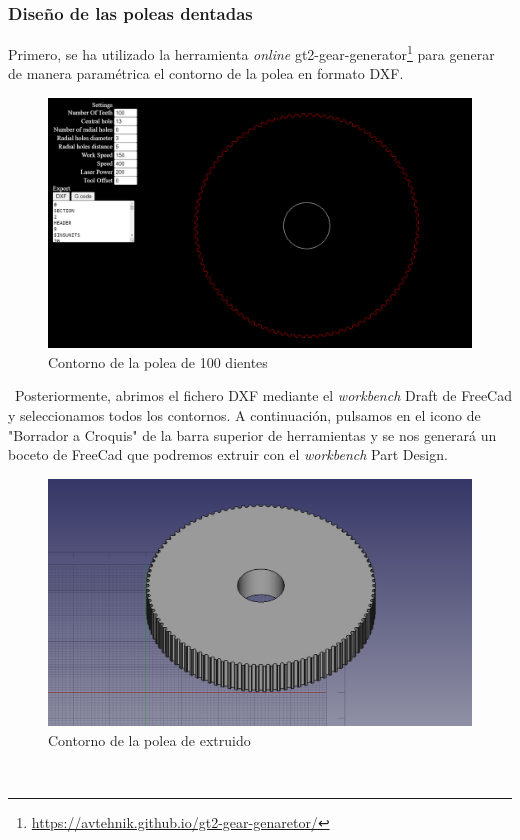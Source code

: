 \subsubsection{Diseño de las poleas dentadas}
Primero, se ha utilizado la herramienta \textit{online} 
gt2-gear-generator\footnote{\url{https://avtehnik.github.io/gt2-gear-genaretor/}} para generar de manera paramétrica el contorno de la polea 
en formato DXF.\\
\begin{figure} [ht!]
  \begin{center}
    \includegraphics[width=14cm]{figs/dxf_polea.png}
  \end{center}
  \caption{Contorno de la polea de 100 dientes}
\end{figure}\ 
Posteriormente, abrimos el fichero DXF mediante el \textit{workbench} Draft de FreeCad y seleccionamos todos los contornos. A continuación, 
pulsamos en el icono de "Borrador a Croquis" de la barra superior de herramientas y se nos generará un boceto de FreeCad que podremos extruir 
con el \textit{workbench} Part Design. 
\begin{figure} [ht!]
  \begin{center}
    \includegraphics[width=14cm]{figs/polea_freecad.png}
  \end{center}
  \caption{Contorno de la polea de extruido}
\end{figure}\ 

